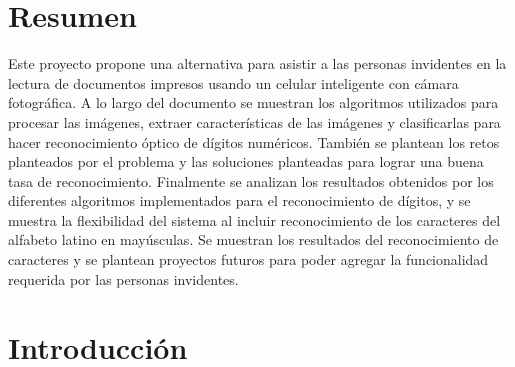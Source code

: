 \documentclass[a4paper, 11pt, oneside]{report}
\begin{document}
\chapter*{Resumen}
Este proyecto propone una alternativa para asistir a las personas invidentes en la lectura de documentos impresos usando un celular inteligente con cámara fotográfica. A lo largo del documento se muestran los algoritmos utilizados para procesar las imágenes, extraer características de las imágenes y clasificarlas para hacer reconocimiento óptico de dígitos numéricos. También se plantean los retos planteados por el problema y las soluciones planteadas para lograr una buena tasa de reconocimiento.
Finalmente se analizan los resultados obtenidos por los diferentes algoritmos implementados para el reconocimiento de dígitos, y se muestra la flexibilidad del sistema al incluir reconocimiento de los caracteres del alfabeto latino en mayúsculas. Se muestran los resultados del reconocimiento de caracteres y se plantean proyectos futuros para poder agregar la funcionalidad requerida por las personas invidentes.
\chapter{Introducción}
\label{chap:intro}
\end{document}
